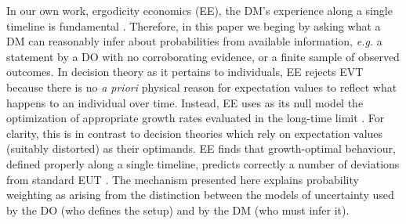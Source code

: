 \documentclass[a4paper, 12pt]{article}
\newcommand{\eg}{\textit{e.g.}\xspace}
\begin{document}

In our own work, ergodicity economics (EE), the DM's experience along a single timeline is fundamental \parencite{Peters2019b}. Therefore, in this paper we beging by asking what a DM can reasonably infer about probabilities from available information, \eg a statement by a DO with no corroborating evidence, or a finite sample of observed outcomes. In decision theory as it pertains to individuals, EE rejects EVT because there is no {\it a priori} physical reason for expectation values to reflect what happens to an individual over time. Instead, EE uses as its null model the optimization of appropriate growth rates evaluated in the long-time limit \parencite{Peters2011a,Peters2011b,Peters2019b}. For clarity, this is in contrast to decision theories which rely on expectation values (suitably distorted) as their optimands. EE finds that growth-optimal behaviour, defined properly along a single timeline, predicts correctly a number of deviations from standard EUT \parencite{MederETAL2019,AdamouETAL2019,BermanKirstein2020}. The mechanism presented here explains probability weighting as arising from the distinction between the models of uncertainty used by the DO (who defines the setup) and by the DM (who must infer it).
\end{document}
